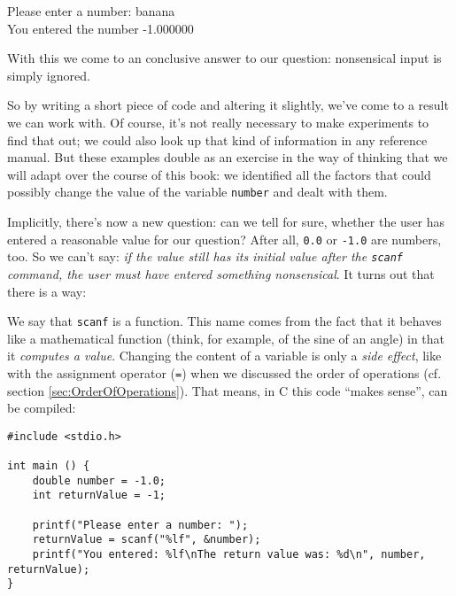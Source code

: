 \begin{cmdbox}
Please enter a number: banana \\
You entered the number -1.000000
\end{cmdbox}

With this we come to an conclusive answer to our question: nonsensical input is simply ignored.

\begin{hintbox}
So by writing a short piece of code and altering it slightly, we've come to a result we can work with. Of course, it's not really necessary to make experiments to find that out; we could also look up that kind of information in any reference manual. But these examples double as an exercise in the way of thinking that we will adapt over the course of this book: we identified all the factors that could possibly change the value of the variable \texttt{number} and dealt with them.
\end{hintbox}

Implicitly, there's now a new question: can we tell for sure, whether the user has entered a reasonable value for our question? After all, \texttt{0.0} or \texttt{-1.0} are numbers, too. So we can't say: \emph{if the value still has its initial value after the \texttt{scanf} command, the user must have entered something nonsensical}. It turns out that there is a way:

We say that \texttt{scanf} is a function. This name comes from the fact that it behaves like a mathematical function (think, for example, of the sine of an angle) in that it \emph{computes a value}. Changing the content of a variable is only a \emph{side effect}, like with the assignment operator (\texttt{=}) when we discussed the order of operations (cf. section \ref{sec:OrderOfOperations}). That means, in C this code \enquote{makes sense}, \ie can be compiled:
\begin{codebox}[returnValue.c]
\begin{verbatim}
#include <stdio.h>

int main () {
    double number = -1.0;
    int returnValue = -1;
    
    printf("Please enter a number: ");
    returnValue = scanf("%lf", &number);
    printf("You entered: %lf\nThe return value was: %d\n", number, returnValue);
}
\end{verbatim}
\end{codebox}

